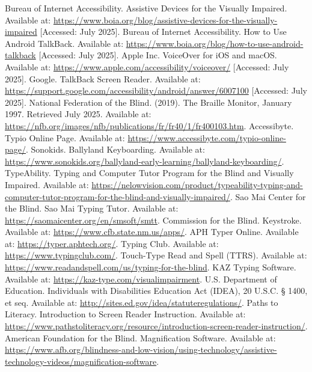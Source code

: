 \begin{thebibliography}{99}
 Bureau of Internet Accessibility. Assistive Devices for the Visually Impaired. Available at: \url{https://www.boia.org/blog/assistive-devices-for-the-visually-impaired} [Accessed: July 2025].
 Bureau of Internet Accessibility. How to Use Android TalkBack. Available at: \url{https://www.boia.org/blog/how-to-use-android-talkback} [Accessed: July 2025].
 Apple Inc. VoiceOver for iOS and macOS. Available at: \url{https://www.apple.com/accessibility/voiceover/} [Accessed: July 2025].
 Google. TalkBack Screen Reader. Available at: \url{https://support.google.com/accessibility/android/answer/6007100} [Accessed: July 2025].
 National Federation of the Blind. (2019). The Braille Monitor, January 1997. Retrieved July 2025. Available at: \url{https://nfb.org/images/nfb/publications/fr/fr40/1/fr400103.htm}.
 Accessibyte. Typio Online Page. Available at: \url{https://www.accessibyte.com/typio-online-page/}.
 Sonokids. Ballyland Keyboarding. Available at: \url{https://www.sonokids.org/ballyland-early-learning/ballyland-keyboarding/}.
 TypeAbility. Typing and Computer Tutor Program for the Blind and Visually Impaired. Available at: \url{https://nelowvision.com/product/typeability-typing-and-computer-tutor-program-for-the-blind-and-visually-impaired/}.
 Sao Mai Center for the Blind. Sao Mai Typing Tutor. Available at: \url{https://saomaicenter.org/en/smsoft/smtt}.
 Commission for the Blind. Keystroke. Available at: \url{https://www.cfb.state.nm.us/apps/}.
 APH Typer Online. Available at: \url{https://typer.aphtech.org/}.
 Typing Club. Available at: \url{https://www.typingclub.com/}.
 Touch-Type Read and Spell (TTRS). Available at: \url{https://www.readandspell.com/us/typing-for-the-blind}.
 KAZ Typing Software. Available at: \url{https://kaz-type.com/visualimpairment}.
 U.S. Department of Education. Individuals with Disabilities Education Act (IDEA), 20 U.S.C. § 1400, et seq. Available at: \url{http://sites.ed.gov/idea/statuteregulations/}.
 Paths to Literacy. Introduction to Screen Reader Instruction. Available at: \url{https://www.pathstoliteracy.org/resource/introduction-screen-reader-instruction/}.
 American Foundation for the Blind. Magnification Software. Available at: \url{https://www.afb.org/blindness-and-low-vision/using-technology/assistive-technology-videos/magnification-software}.

\end{thebibliography}
